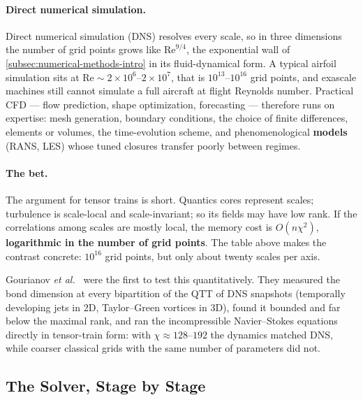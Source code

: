 \paragraph{Direct numerical simulation.}
Direct numerical simulation (DNS) resolves every scale, so in three dimensions
the number of grid points grows like $\mathrm{Re}^{9/4}$, the exponential wall
of \cref{subsec:numerical-methods-intro} in its fluid-dynamical form. A typical
airfoil simulation sits at $\mathrm{Re} \sim 2\times10^6$--$2\times10^7$, that is
$10^{13}$--$10^{16}$ grid points, and exascale machines still cannot simulate a
full aircraft at flight Reynolds number. Practical CFD --- flow prediction, shape
optimization, forecasting --- therefore runs on expertise: mesh generation,
boundary conditions, the choice of finite differences, elements or volumes, the
time-evolution scheme, and phenomenological \textbf{models} (RANS, LES) whose
tuned closures transfer poorly between regimes.

\paragraph{The bet.}
The argument for tensor trains is short. Quantics cores represent scales;
turbulence is scale-local and scale-invariant; so its fields may have low rank.
If the correlations among scales are mostly local, the memory cost is
$O(n\chi^2)$, \textbf{logarithmic in the number of grid points}. The table above
makes the contrast concrete: $10^{16}$ grid points, but only about twenty scales
per axis.

Gourianov \emph{et al.}~\cite{Gourianov2022} were the first to test this
quantitatively. They measured the bond dimension at every bipartition of the QTT
of DNS snapshots (temporally developing jets in 2D, Taylor--Green vortices in
3D), found it bounded and far below the maximal rank, and ran the incompressible
Navier--Stokes equations directly in tensor-train form: with $\chi \approx
128$--$192$ the dynamics matched DNS, while coarser classical grids with the same
number of parameters did not.

\subsection{The Solver, Stage by Stage}
\label{subsec:qtt-cfd-frameworks}

